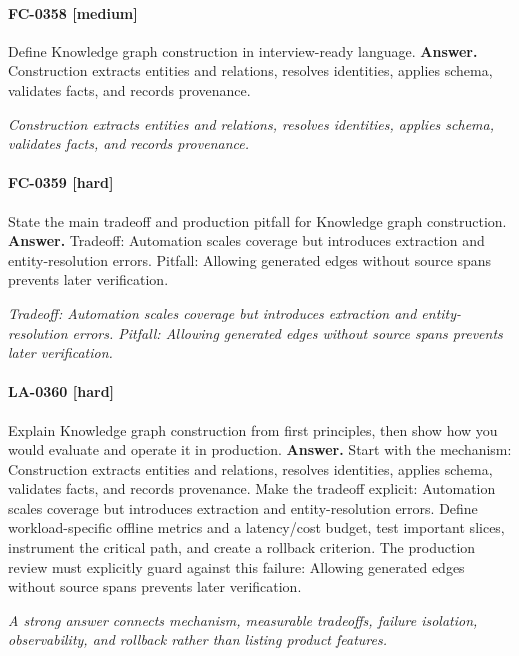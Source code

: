\paragraph{FC-0358 [medium]} Define Knowledge graph construction in interview-ready language.
\noindent\textbf{Answer.} Construction extracts entities and relations, resolves identities, applies schema, validates facts, and records provenance.
\par\textit{Construction extracts entities and relations, resolves identities, applies schema, validates facts, and records provenance.}
\paragraph{FC-0359 [hard]} State the main tradeoff and production pitfall for Knowledge graph construction.
\noindent\textbf{Answer.} Tradeoff: Automation scales coverage but introduces extraction and entity-resolution errors. Pitfall: Allowing generated edges without source spans prevents later verification.
\par\textit{Tradeoff: Automation scales coverage but introduces extraction and entity-resolution errors. Pitfall: Allowing generated edges without source spans prevents later verification.}
\paragraph{LA-0360 [hard]} Explain Knowledge graph construction from first principles, then show how you would evaluate and operate it in production.
\noindent\textbf{Answer.} Start with the mechanism: Construction extracts entities and relations, resolves identities, applies schema, validates facts, and records provenance. Make the tradeoff explicit: Automation scales coverage but introduces extraction and entity-resolution errors. Define workload-specific offline metrics and a latency/cost budget, test important slices, instrument the critical path, and create a rollback criterion. The production review must explicitly guard against this failure: Allowing generated edges without source spans prevents later verification.
\par\textit{A strong answer connects mechanism, measurable tradeoffs, failure isolation, observability, and rollback rather than listing product features.}
